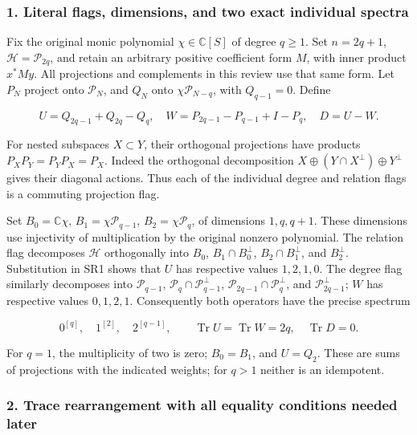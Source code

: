 \documentclass{article}
\begin{document}
\subsubsection{1. Literal flags, dimensions, and two exact individual spectra}\label{endpoint-four_window_sharpness_review--literal-flags-dimensions-and-two-exact-individual-spectra}

Fix the original monic polynomial \(\chi\in\mathbb C[S]\) of degree \(q\ge1\). Set \(n=2q+1\), \(\mathcal H=\mathcal P_{2q}\), and retain an arbitrary positive coefficient form \(M\), with inner product \(x^*My\). All projections and complements in this review use that same form. Let \(P_N\) project onto \(\mathcal P_N\), and \(Q_N\) onto \(\chi\mathcal P_{N-q}\), with \(Q_{q-1}=0\). Define

\[
U=Q_{2q-1}+Q_{2q}-Q_q,\quad
W=P_{2q-1}-P_{q-1}+I-P_q,\quad D=U-W.
\tag{SR1}
\]

For nested subspaces \(X\subset Y\), their orthogonal projections have products \(P_XP_Y=P_YP_X=P_X\). Indeed the orthogonal decomposition \(X\oplus(Y\cap X^\perp)\oplus Y^\perp\) gives their diagonal actions. Thus each of the individual degree and relation flags is a commuting projection flag.

Set \(B_0=\mathbb C\chi\), \(B_1=\chi\mathcal P_{q-1}\), \(B_2=\chi\mathcal P_q\), of dimensions \(1,q,q+1\). These dimensions use injectivity of multiplication by the original nonzero polynomial. The relation flag decomposes \(\mathcal H\) orthogonally into \(B_0\), \(B_1\cap B_0^\perp\), \(B_2\cap B_1^\perp\), and \(B_2^\perp\). Substitution in SR1 shows that \(U\) has respective values \(1,2,1,0\). The degree flag similarly decomposes into \(\mathcal P_{q-1}\), \(\mathcal P_q\cap\mathcal P_{q-1}^\perp\), \(\mathcal P_{2q-1}\cap\mathcal P_q^\perp\), and \(\mathcal P_{2q-1}^\perp\); \(W\) has respective values \(0,1,2,1\). Consequently both operators have the precise spectrum

\[
0^{[q]},\quad 1^{[2]},\quad 2^{[q-1]},
\qquad \operatorname{Tr}U=\operatorname{Tr}W=2q,\quad
\operatorname{Tr}D=0.
\tag{SR2}
\]

For \(q=1\), the multiplicity of two is zero; \(B_0=B_1\), and \(U=Q_2\). These are sums of projections with the indicated weights; for \(q>1\) neither is an idempotent.

\subsubsection{2. Trace rearrangement with all equality conditions needed later}\label{endpoint-four_window_sharpness_review--trace-rearrangement-with-all-equality-conditions-needed-later}
\end{document}

